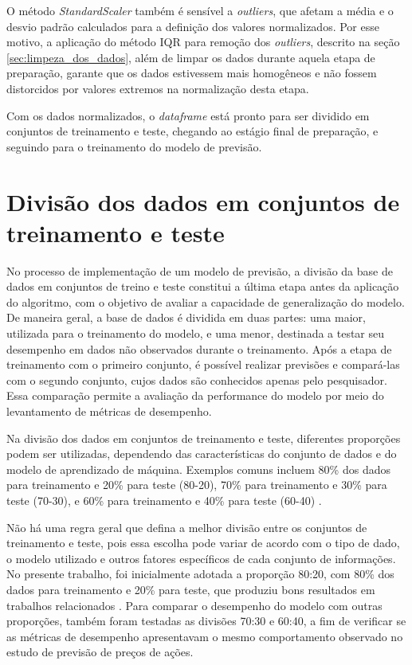 O método \textit{StandardScaler} também é sensível a \textit{outliers}, que afetam a média e o desvio padrão calculados para a definição dos valores normalizados. Por esse motivo, a aplicação do método \gls{IQR} para remoção dos \textit{outliers}, descrito na seção \ref{sec:limpeza_dos_dados}, além de limpar os dados durante aquela etapa de preparação, garante que os dados estivessem mais homogêneos e não fossem distorcidos por valores extremos na normalização desta etapa.

Com os dados normalizados, o \textit{dataframe} está pronto para ser dividido em conjuntos de treinamento e teste, chegando ao estágio final de preparação, e seguindo para o treinamento do modelo de previsão. 

\section{Divisão dos dados em conjuntos de treinamento e teste}
\label{sec:divisao_dados_treino_teste}

No processo de implementação de um modelo de previsão, a divisão da base de dados em conjuntos de treino e teste constitui a última etapa antes da aplicação do algoritmo, com o objetivo de avaliar a capacidade de generalização do modelo. De maneira geral, a base de dados é dividida em duas partes: uma maior, utilizada para o treinamento do modelo, e uma menor, destinada a testar seu desempenho em dados não observados durante o treinamento. Após a etapa de treinamento com o primeiro conjunto, é possível realizar previsões e compará-las com o segundo conjunto, cujos dados são conhecidos apenas pelo pesquisador. Essa comparação permite a avaliação da performance do modelo por meio do levantamento de métricas de desempenho.

Na divisão dos dados em conjuntos de treinamento e teste, diferentes proporções podem ser utilizadas, dependendo das características do conjunto de dados e do modelo de aprendizado de máquina. Exemplos comuns incluem 80\% dos dados para treinamento e 20\% para teste (80-20), 70\% para treinamento e 30\% para teste (70-30), e 60\% para treinamento e 40\% para teste (60-40) \cite{supri2023asian}.

Não há uma regra geral que defina a melhor divisão entre os conjuntos de treinamento e teste, pois essa escolha pode variar de acordo com o tipo de dado, o modelo utilizado e outros fatores específicos de cada conjunto de informações. No presente trabalho, foi inicialmente adotada a proporção 80:20, com 80\% dos dados para treinamento e 20\% para teste, que produziu bons resultados em trabalhos relacionados \cite{supri2023asian}. Para comparar o desempenho do modelo com outras proporções, também foram testadas as divisões 70:30 e 60:40, a fim de verificar se as métricas de desempenho apresentavam o mesmo comportamento observado no estudo de previsão de preços de ações.

